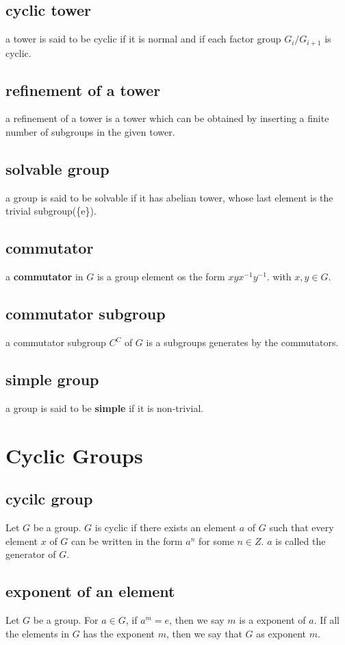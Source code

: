 \documentclass[11pt]{article}
\begin{document}
\subsection{cyclic tower}
\label{sec:orgb565ce9}
a tower is said to be cyclic if it is normal and if each factor 
group \(G_i/G_{i+1}\) is cyclic.
\subsection{refinement of a tower}
\label{sec:orgf02ee04}
a refinement of a tower is a tower which can be obtained by inserting
a finite number of subgroups in the given tower.
\subsection{solvable group}
\label{sec:org9db09f4}
a group is said to be solvable if it has abelian tower, whose
last element is the trivial subgroup(\{e\}).
\subsection{commutator}
\label{sec:orgdf96784}
a \textbf{commutator} in \(G\) is a group element os the form \(xyx^{-1}y^{-1}\).
with \(x, y\in G\).
\subsection{commutator subgroup}
\label{sec:org52bc16d}
a commutator subgroup \(C^C\) of \(G\) is a subgroups generates by the 
commutators.
\subsection{simple group}
\label{sec:orga1bde89}
a group is said to be \textbf{simple} if it is non-trivial.

\section{Cyclic Groups}
\label{sec:org5322a3f}
\subsection{cycilc group}
\label{sec:org895eb81}
Let \(G\) be a group. \(G\) is cyclic if there exists an element
\(a\) of \(G\) such that every element \(x\) of \(G\) can be written
in the form \(a^n\) for some \(n\in Z\).
\(a\) is called the generator of \(G\).
\subsection{exponent of an element}
\label{sec:orgc6ab9b5}
Let \(G\) be a group.
For \(a\in G\), if \(a^m = e\), then we say \(m\) is a exponent of \(a\).
If all the elements in \(G\) has the exponent \(m\), then we say that \(G\) as exponent \(m\).
\end{document}
